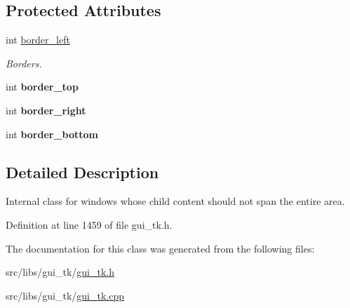 \subsection*{Protected Attributes}
\begin{DoxyCompactItemize}
\item 
\hypertarget{classGUI_1_1BorderedWindow_aee7cb08a129656be54ca7c80f6a1e773}{int \hyperlink{classGUI_1_1BorderedWindow_aee7cb08a129656be54ca7c80f6a1e773}{border\-\_\-left}}\label{classGUI_1_1BorderedWindow_aee7cb08a129656be54ca7c80f6a1e773}

\begin{DoxyCompactList}\small\item\em Borders. \end{DoxyCompactList}\item 
\hypertarget{classGUI_1_1BorderedWindow_ae68c7db90609df20c166ccff4fedcbd4}{int {\bfseries border\-\_\-top}}\label{classGUI_1_1BorderedWindow_ae68c7db90609df20c166ccff4fedcbd4}

\item 
\hypertarget{classGUI_1_1BorderedWindow_a3d1e6ac0d63e78e79900129f6e6a07c3}{int {\bfseries border\-\_\-right}}\label{classGUI_1_1BorderedWindow_a3d1e6ac0d63e78e79900129f6e6a07c3}

\item 
\hypertarget{classGUI_1_1BorderedWindow_a2daa40a7c446a6753d39f5a3096546b9}{int {\bfseries border\-\_\-bottom}}\label{classGUI_1_1BorderedWindow_a2daa40a7c446a6753d39f5a3096546b9}

\end{DoxyCompactItemize}


\subsection{Detailed Description}
Internal class for windows whose child content should not span the entire area. 

Definition at line 1459 of file gui\-\_\-tk.\-h.



The documentation for this class was generated from the following files\-:\begin{DoxyCompactItemize}
\item 
src/libs/gui\-\_\-tk/\hyperlink{gui__tk_8h}{gui\-\_\-tk.\-h}\item 
src/libs/gui\-\_\-tk/\hyperlink{gui__tk_8cpp}{gui\-\_\-tk.\-cpp}\end{DoxyCompactItemize}
